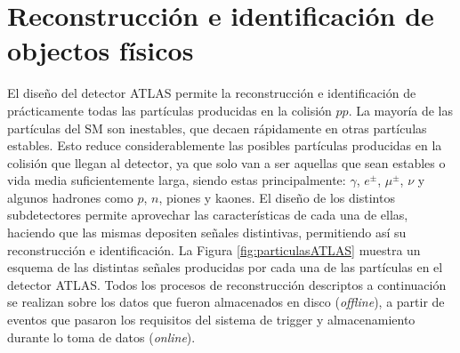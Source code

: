 \chapter{Reconstrucción e identificación de objectos físicos}\label{cap:objects}



El diseño del detector ATLAS permite la reconstrucción e identificación de prácticamente todas las
partículas producidas en la colisión $pp$. 
La mayoría de las partículas del SM son inestables, que decaen rápidamente en otras partículas estables. Esto reduce considerablemente las posibles partículas producidas en la colisión que llegan al detector, ya que solo van a ser aquellas que sean estables o vida media suficientemente larga, siendo estas principalmente: $\gamma$, $e^{\pm}$, $\mu^{\pm}$, $\nu$ y algunos hadrones
como $p$, $n$, piones y kaones. El diseño de los distintos subdetectores permite aprovechar las
características de cada una de ellas, haciendo que las mismas depositen señales distintivas, permitiendo así su reconstrucción e identificación. La Figura \ref{fig:particulasATLAS} muestra un esquema de las distintas señales producidas por cada una de las partículas en el detector ATLAS. Todos los procesos de reconstrucción descriptos a continuación se realizan sobre los datos que fueron almacenados en disco (\textit{offline}), a partir de eventos que pasaron los requisitos del sistema de trigger y almacenamiento durante lo toma de datos (\textit{online}).




